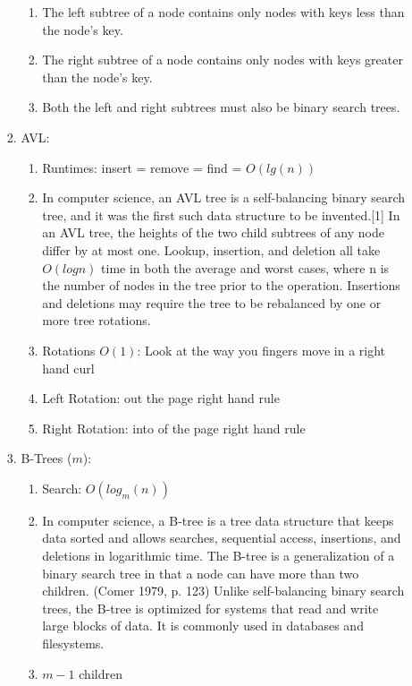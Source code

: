 \documentclass[12pt]{article}
\renewcommand{\=}[1]{\stackrel{#1}{=}} %
\theoremstyle{definition}
\theoremstyle{remark}
\begin{document}
\begin{enumerate}
\begin{enumerate}
\begin{enumerate}
        \begin{enumerate}
        \item The left subtree of a node contains only nodes with keys less than the node's key.
        \item The right subtree of a node contains only nodes with keys greater than the node's key.
        \item Both the left and right subtrees must also be binary search trees.
        \end{enumerate}
      \item AVL:
        \begin{enumerate}
        \item Runtimes: insert = remove = find = $O(lg(n))$
        \item In computer science, an AVL tree is a self-balancing binary search tree, and it was the first such data structure to be invented.[1] In an AVL tree, the heights of the two child subtrees of any node differ by at most one. Lookup, insertion, and deletion all take $O(log n)$ time in both the average and worst cases, where n is the number of nodes in the tree prior to the operation. Insertions and deletions may require the tree to be rebalanced by one or more tree rotations.
        \item Rotations $O(1)$: Look at the way you fingers move in a
          right hand curl
        \item Left Rotation: out the page right hand rule
        \item Right Rotation: into of the page right hand rule
        \end{enumerate}
      \item B-Trees ($m$):
        \begin{enumerate}
        \item Search: $O( log_m(n))$
        \item In computer science, a B-tree is a tree data structure
          that keeps data sorted and allows searches, sequential
          access, insertions, and deletions in logarithmic time. The
          B-tree is a generalization of a binary search tree in that a
          node can have more than two children. (Comer 1979, p. 123)
          Unlike self-balancing binary search trees, the B-tree is
          optimized for systems that read and write large blocks of
          data. It is commonly used in databases and filesystems.
        \item $m-1$ children
        \end{enumerate}

\end{enumerate}
\end{enumerate}
\end{enumerate}
\end{document}
